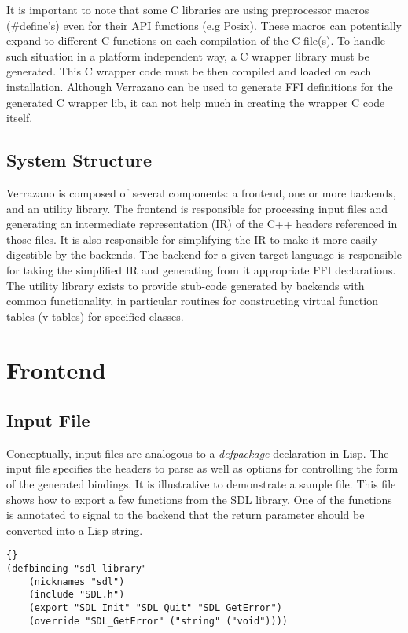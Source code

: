 \documentclass[12pt]{article}
\begin{document}
It is important to note that some C libraries are using preprocessor macros (\#define's) even for their API functions (e.g Posix). These macros can potentially expand to different C functions on each compilation of the C file(s). To handle such situation in a platform independent way, a C wrapper library must be generated. This C wrapper code must be then compiled and loaded on each installation. Although Verrazano can be used to generate FFI definitions for the generated C wrapper lib, it can not help much in creating the wrapper C code itself.

\subsection{System Structure}
Verrazano is composed of several components: a frontend, one or more backends, and an utility library. The frontend is responsible for processing input files and generating an intermediate representation (IR) of the C++ headers referenced in those files. It is also responsible for simplifying the IR to make it more easily digestible by the backends. The backend for a given target language is responsible for taking the simplified IR and generating from it appropriate FFI declarations. The utility library exists to provide stub-code generated by backends with common functionality, in particular routines for constructing virtual function tables (v-tables) for specified classes. 

\section{Frontend}

\subsection{Input File}
Conceptually, input files are analogous to a \emph{defpackage} declaration in Lisp. The input file specifies the headers to parse as well as options for controlling the form of the generated bindings. It is illustrative to demonstrate a sample file. This file shows how to export a few functions from the SDL library. One of the functions is annotated to signal to the backend that the return parameter should be converted into a Lisp string.

\lstset{language=lisp}
\begin{lstlisting}[frame=trbl]{}
(defbinding "sdl-library"
    (nicknames "sdl")
    (include "SDL.h")
    (export "SDL_Init" "SDL_Quit" "SDL_GetError")
    (override "SDL_GetError" ("string" ("void"))))
\end{lstlisting}
\end{document}
